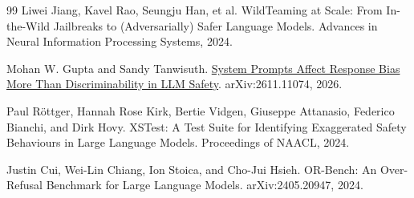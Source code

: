 \documentclass[11pt]{article}
\begin{document}
\begin{thebibliography}{99}
Liwei Jiang, Kavel Rao, Seungju Han, et al.
\newblock WildTeaming at Scale: From In-the-Wild Jailbreaks to (Adversarially) Safer Language Models.
\newblock Advances in Neural Information Processing Systems, 2024.

Mohan W. Gupta and Sandy Tanwisuth.
\newblock \href{https://arxiv.org/abs/2611.11074}{System Prompts Affect Response Bias More Than Discriminability in LLM Safety}.
\newblock arXiv:2611.11074, 2026.

Paul Röttger, Hannah Rose Kirk, Bertie Vidgen, Giuseppe Attanasio, Federico Bianchi, and Dirk Hovy.
\newblock XSTest: A Test Suite for Identifying Exaggerated Safety Behaviours in Large Language Models.
\newblock Proceedings of NAACL, 2024.

Justin Cui, Wei-Lin Chiang, Ion Stoica, and Cho-Jui Hsieh.
\newblock OR-Bench: An Over-Refusal Benchmark for Large Language Models.
\newblock arXiv:2405.20947, 2024.

\end{thebibliography}
\end{document}
